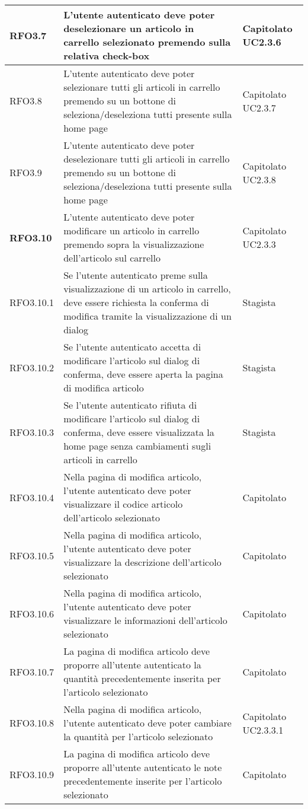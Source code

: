 {\begin{center}
\begin{longtable}{ | >{\centering\arraybackslash}p{2.5cm} | >{\arraybackslash}p{7cm} | >{\centering\arraybackslash}p{2cm} | }
RFO3.7 & L'utente autenticato deve poter deselezionare un articolo in carrello selezionato premendo sulla relativa check-box & Capitolato UC2.3.6 \\ \hline
RFO3.8 & L'utente autenticato deve poter selezionare tutti gli articoli in carrello premendo su un bottone di seleziona/deseleziona tutti presente sulla home page & Capitolato UC2.3.7\\ \hline
RFO3.9 & L'utente autenticato deve poter deselezionare tutti gli articoli in carrello premendo su un bottone di seleziona/deseleziona tutti presente sulla home page & Capitolato UC2.3.8 \\ \hline
\textbf{RFO3.10} & L'utente autenticato deve poter modificare un articolo in carrello premendo sopra la visualizzazione dell'articolo sul carrello & Capitolato UC2.3.3\\ \hline
RFO3.10.1 & Se l'utente autenticato preme sulla visualizzazione di un articolo in carrello, deve essere richiesta la conferma di modifica tramite la visualizzazione di un dialog & Stagista \\ \hline
RFO3.10.2 & Se l'utente autenticato accetta di modificare l'articolo sul dialog di conferma, deve essere aperta la pagina di modifica articolo & Stagista \\ \hline
RFO3.10.3 & Se l'utente autenticato rifiuta di modificare l'articolo sul dialog di conferma, deve essere visualizzata la home page senza cambiamenti sugli articoli in carrello & Stagista \\ \hline
RFO3.10.4 & Nella pagina di modifica articolo, l'utente autenticato deve poter visualizzare il codice articolo dell'articolo selezionato & Capitolato \\ \hline
RFO3.10.5 & Nella pagina di modifica articolo, l'utente autenticato deve poter visualizzare la descrizione dell'articolo selezionato & Capitolato \\ \hline
RFO3.10.6 & Nella pagina di modifica articolo, l'utente autenticato deve poter visualizzare le informazioni dell'articolo selezionato & Capitolato \\ \hline
RFO3.10.7 & La pagina di modifica articolo deve proporre all'utente autenticato la quantità precedentemente inserita per l'articolo selezionato & Capitolato \\ \hline
RFO3.10.8 & Nella pagina di modifica articolo, l'utente autenticato deve poter cambiare la quantità per l'articolo selezionato & Capitolato UC2.3.3.1 \\ \hline
RFO3.10.9 & La pagina di modifica articolo deve proporre all'utente autenticato le note precedentemente inserite per l'articolo selezionato & Capitolato \\ \hline

\end{longtable}
\end{center}}
